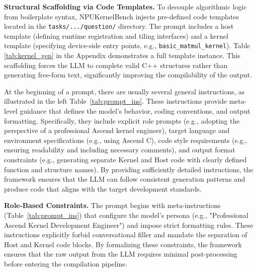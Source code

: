 \textbf{Structural Scaffolding via Code Templates.} To decouple algorithmic logic from boilerplate syntax, NPUKernelBench injects pre-defined code templates located in the \texttt{tasks/.../question/} directory. The prompt includes a host template (defining runtime registration and tiling interfaces) and a kernel template (specifying device-side entry points, e.g., \texttt{basic\_matmul\_kernel}). Table \ref{tab:kernel_gen} in the Appendix demonstrates a full template instance. This scaffolding forces the LLM to complete valid C++ structures rather than generating free-form text, significantly improving the compilability of the output.

At the beginning of a prompt, there are usually several general instructions, as illustrated in the left Table~\ref{tab:prompt_ins}. These instructions provide meta-level guidance that defines the model’s behavior, coding conventions, and output formatting. Specifically, they include explicit role prompts (e.g., adopting the perspective of a professional Ascend kernel engineer), target language and environment specifications (e.g., using Ascend C), code style requirements (e.g., ensuring readability and including necessary comments), and output format constraints (e.g., generating separate Kernel and Host code with clearly defined function and structure names). By providing sufficiently detailed instructions, the framework ensures that the LLM can follow consistent generation patterns and produce code that aligns with the target development standards.

\textbf{Role-Based Constraints.} The prompt begins with meta-instructions (Table~\ref{tab:prompt_ins}) that configure the model's persona (e.g., "Professional Ascend Kernel Development Engineer") and impose strict formatting rules. These instructions explicitly forbid conversational filler and mandate the separation of Host and Kernel code blocks. By formalizing these constraints, the framework ensures that the raw output from the LLM requires minimal post-processing before entering the compilation pipeline.


